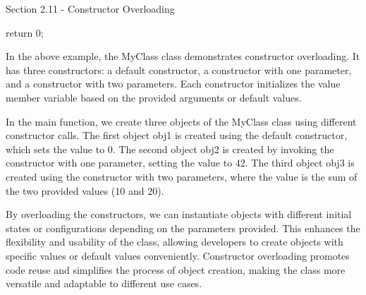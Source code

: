 \begin{notes}{Section 2.11 - Constructor Overloading}
\begin{highlight}
\begin{code}[C++]
{        return 0;
    }
    \end{code}
        In the above example, the MyClass class demonstrates constructor overloading. It has three constructors: a default constructor, a constructor with one parameter, and a constructor with two parameters. Each constructor initializes the value member variable based on the provided arguments 
        or default values.
    
        In the main function, we create three objects of the MyClass class using different constructor calls. The first object obj1 is created using the default constructor, which sets the value to 0. The second object obj2 is created by invoking the constructor with one parameter, 
        setting the value to 42. The third object obj3 is created using the constructor with two parameters, where the value is the sum of the two provided values (10 and 20).
    
        By overloading the constructors, we can instantiate objects with different initial states or configurations depending on the parameters provided. This enhances the flexibility and usability of the class, allowing developers to create objects with specific values or default values 
        conveniently. Constructor overloading promotes code reuse and simplifies the process of object creation, making the class more versatile and adaptable to different use cases.
    \end{highlight}
\end{notes}

